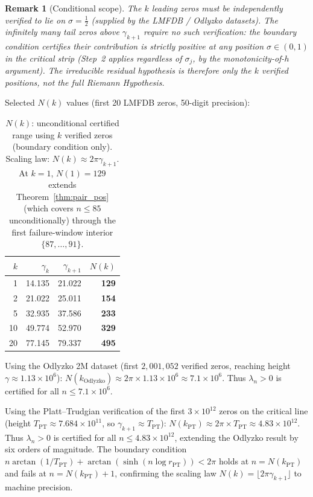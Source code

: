 \documentclass[11pt]{article}
\newtheorem{remark}[theorem]{Remark}
\begin{document}
\begin{remark}[Conditional scope]
The $k$ leading zeros must be independently verified to lie on $\sigma=\tfrac{1}{2}$
(supplied by the LMFDB / Odlyzko datasets). The infinitely many tail zeros above
$\gamma_{k+1}$ require no such verification: the boundary condition certifies their
contribution is strictly positive at any position $\sigma \in (0,1)$ in the critical strip
(Step~2 applies regardless of $\sigma_j$, by the monotonicity-of-$h$ argument).
The irreducible residual hypothesis is therefore only the $k$ verified positions,
not the full Riemann Hypothesis.
\end{remark}

Selected $N(k)$ values (first 20 LMFDB zeros, 50-digit precision):

\begin{table}[H]
\centering
\begin{tabular}{rrrr}
\toprule
$k$ & $\gamma_k$ & $\gamma_{k+1}$ & $N(k)$ \\
\midrule
1  & 14.135 & 21.022 & \textbf{129} \\
2  & 21.022 & 25.011 & \textbf{154} \\
5  & 32.935 & 37.586 & \textbf{233} \\
10 & 49.774 & 52.970 & \textbf{329} \\
20 & 77.145 & 79.337 & \textbf{495} \\
\bottomrule
\end{tabular}
\caption{$N(k)$: unconditional certified range using $k$ verified zeros (boundary condition only).
Scaling law: $N(k) \approx 2\pi\gamma_{k+1}$.  At $k=1$, $N(1)=129$ extends Theorem~\ref{thm:pair_pos}
(which covers $n\le 85$ unconditionally) through the first failure-window interior $\{87,\ldots,91\}$.}
\end{table}

Using the Odlyzko 2M dataset (first $2{,}001{,}052$ verified zeros, reaching height
$\gamma \approx 1.13\times10^6$):
$N(k_{\mathrm{Odlyzko}}) \approx 2\pi \times 1.13\times10^6 \approx 7.1\times10^6$.
Thus $\lambda_n > 0$ is certified for all $n \le 7.1\times10^6$.

Using the Platt--Trudgian verification of the first $3\times10^{12}$ zeros on the
critical line \cite{platt2021} (height $T_{\mathrm{PT}} \approx 7.684\times10^{11}$,
so $\gamma_{k+1} \approx T_{\mathrm{PT}}$):
$N(k_{\mathrm{PT}}) \approx 2\pi \times T_{\mathrm{PT}} \approx 4.83\times10^{12}$.
Thus $\lambda_n > 0$ is certified for all $n \le 4.83\times10^{12}$, extending the
Odlyzko result by six orders of magnitude.  The boundary condition
$n\arctan(1/T_{\mathrm{PT}}) + \arctan(\sinh(n\log r_{\mathrm{PT}})) < 2\pi$
holds at $n = N(k_{\mathrm{PT}})$ and fails at $n = N(k_{\mathrm{PT}})+1$, confirming
the scaling law $N(k) = \lfloor 2\pi\gamma_{k+1}\rfloor$ to machine precision.
\end{document}
